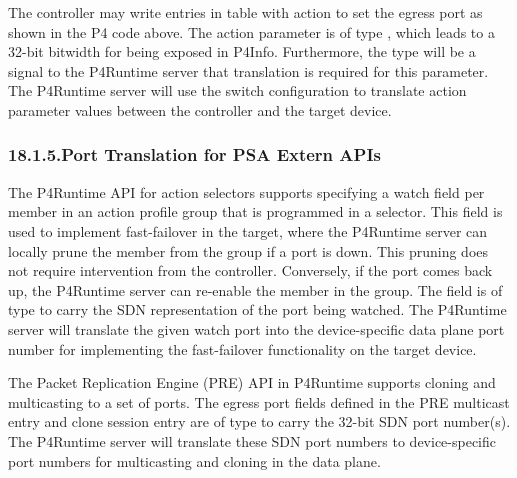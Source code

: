 \documentclass[11pt]{article}
\begin{document}
{%
\noindent{}The controller may write entries in table  with action  to set the egress
port as shown in the P4 code above. The action parameter  is of type
, which leads to a 32-bit bitwidth for  being exposed in
P4Info. Furthermore, the type will be a signal to the P4Runtime server that
translation is required for this parameter. The P4Runtime server will use the
switch configuration to translate action parameter values between the controller
and the target device.%

\subsubsection{18.1.5.\hspace*{0.5em}Port Translation for PSA Extern APIs}\label{sec-port-translation-for-psa-extern-apis}%

\noindent{}The P4Runtime API for action selectors supports specifying a watch field per
member in an action profile group that is programmed in a selector. This field
is used to implement fast-failover in the target, where the P4Runtime server can
locally prune the member from the group if a port is down. This pruning does not
require intervention from the controller. Conversely, if the port comes back up,
the P4Runtime server can re-enable the member in the group. The 
field is of type  to carry the SDN representation of the port being
watched. The P4Runtime server will translate the given watch port into
the device-specific data plane port number for implementing the fast-failover
functionality on the target device.%

The Packet Replication Engine (PRE) API in P4Runtime supports cloning and
multicasting to a set of ports. The egress port fields defined in the PRE
multicast entry and clone session entry are of type  to carry the 32-bit
SDN port number(s). The P4Runtime server will translate these SDN port numbers
to device-specific port numbers for multicasting and cloning in the data plane.%

}
\end{document}
